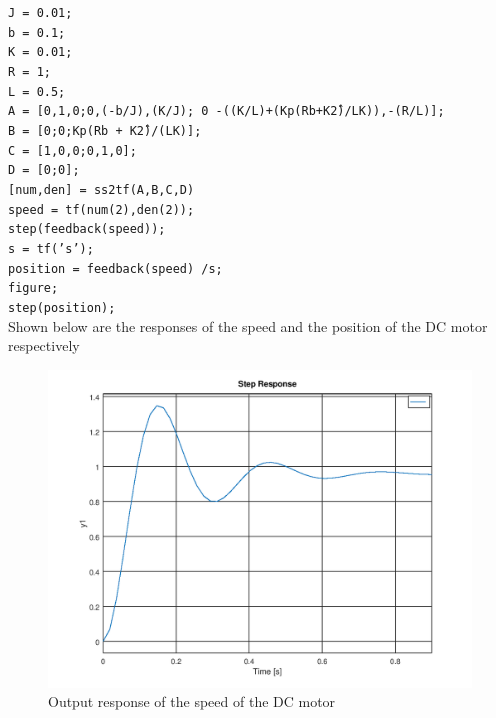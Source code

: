 \documentclass[a4paper, 12pt]{article}
\begin{document}
\noindent
\texttt{J = 0.01;}\\
\texttt{b = 0.1;}\\
\texttt{K = 0.01;}\\
\texttt{R = 1;}\\
\texttt{L = 0.5;}\\
\texttt{A = [0,1,0;0,(-b/J),(K/J); 0 -((K/L)+(Kp\*(R\*b+K\^2)/L\*K)),-(R/L)];}\\
\texttt{B = [0;0;Kp\*(R\*b + K\^2)/(L\*K)];}\\
\texttt{C = [1,0,0;0,1,0];}\\
\texttt{D = [0;0];}\\
\texttt{[num,den] = ss2tf(A,B,C,D)}\\
\texttt{speed = tf(num(2),den(2));}\\
\texttt{step(feedback(speed));}\\
\texttt{s = tf('s');}\\
\texttt{position = feedback(speed) /s;}\\
\texttt{figure;}\\
\texttt{step(position);}\\

Shown below are the responses of the speed and the position of the DC motor respectively

\begin{figure}[H]
	\centering
	\includegraphics[width=\textwidth]{Images/question_3_speed.png}
	\caption{Output response of the speed of the DC motor}
	\label{fig:question_3_speed}
\end{figure}
\end{document}
